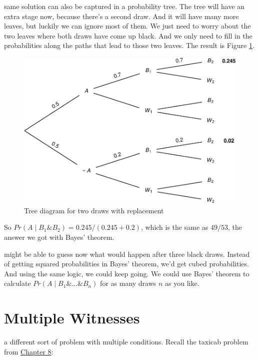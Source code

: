 \documentclass[justified]{tufte-book}
\newcommand{\given}{\mid}
\renewcommand{\wedge}{\mathbin{\&}}
\newcommand{\p}{Pr}
\theoremstyle{definition}
\theoremstyle{definition}
\theoremstyle{definition}
\theoremstyle{remark}
\begin{document}
 same solution can also be captured in a probability
tree. The tree will have an extra stage now, because there's a second
draw. And it will have many more leaves, but luckily we can ignore most
of them. We just need to worry about the two leaves where both draws
have come up black. And we only need to fill in the probabilities along
the paths that lead to those two leaves. The result is Figure
\ref{fig:twodrawsreplacement}.

\begin{figure}
\includegraphics{_main_files/figure-latex/twodrawsreplacement-1} \caption[Tree diagram for two draws with replacement]{Tree diagram for two draws with replacement}\label{fig:twodrawsreplacement}
\end{figure}

So \(\p(A \given B_1 \wedge B_2) = 0.245 / (0.245 + 0.2)\), which is the
same as \(49/53\), the answer we got with Bayes' theorem.

 might be able to guess now what would happen after
three black draws. Instead of getting squared probabilities in Bayes'
theorem, we'd get cubed probabilities. And using the same logic, we
could keep going. We could use Bayes' theorem to calculate
\(\p(A \given B_1 \wedge \ldots \wedge B_n)\) for as many draws \(n\) as
you like.

\hypertarget{multiple-witnesses}{%
\section{Multiple Witnesses}\label{multiple-witnesses}}

 a different sort of problem with multiple
conditions. Recall the taxicab problem from
\protect\hyperlink{chbayes}{Chapter 8}:
\end{document}
